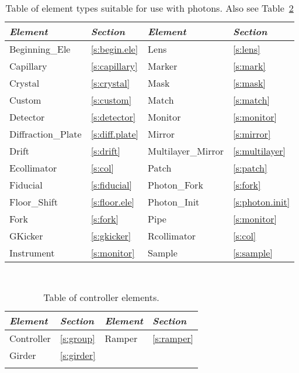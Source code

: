 \begin{table}[ht]
\centering
{\tt
\begin{tabular}{llll} \toprule
  {\it Element}      & {\it Section}         & {\it Element}         & {\it Section}       \\ \midrule
  Beginning_Ele      & \ref{s:begin.ele}     &    Lens               & \ref{s:lens}        \\
  Capillary          & \ref{s:capillary}     &  Marker               & \ref{s:mark}        \\
  Crystal            & \ref{s:crystal}       &  Mask                 & \ref{s:mask}        \\
  Custom             & \ref{s:custom}        &  Match                & \ref{s:match}       \\
  Detector           & \ref{s:detector}      &  Monitor              & \ref{s:monitor}     \\ 
  Diffraction_Plate  & \ref{s:diff.plate}    &  Mirror               & \ref{s:mirror}      \\
  Drift              & \ref{s:drift}         &  Multilayer_Mirror    & \ref{s:multilayer}  \\
  Ecollimator        & \ref{s:col}           &  Patch                & \ref{s:patch}       \\
  Fiducial           & \ref{s:fiducial}      &  Photon_Fork          & \ref{s:fork}        \\
  Floor_Shift        & \ref{s:floor.ele}     &  Photon_Init          & \ref{s:photon.init} \\
  Fork               & \ref{s:fork}          &  Pipe                 & \ref{s:monitor}     \\
  GKicker            & \ref{s:gkicker}       &  Rcollimator          & \ref{s:col}         \\
  Instrument         & \ref{s:monitor}       &  Sample               & \ref{s:sample}      \\
  \bottomrule
\end{tabular}
}
\caption{Table of element types suitable for use with photons. Also see Table~\ref{t:control.classes}}
\label{t:photon.classes}
\end{table}

\begin{table}[ht]
\centering
{\tt
\begin{tabular}{llll} \toprule
  {\it Element}  & {\it Section}     & {\it Element}  & {\it Section}    \\ \midrule
  Controller     & \ref{s:group}     &  Ramper        & \ref{s:ramper}   \\
  Girder         & \ref{s:girder}    &                &                  \\
 \\ \bottomrule
\end{tabular}
}
\caption{Table of controller elements.}
\label{t:control.classes}
\end{table}

